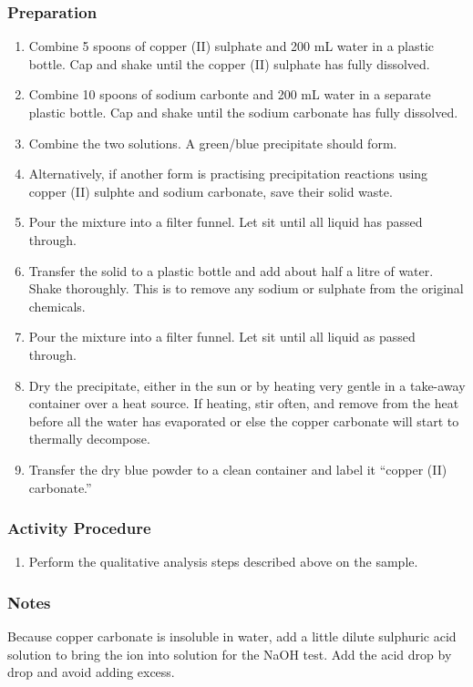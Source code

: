 \subsubsection{Preparation}
\begin{enumerate}
\item{Combine 5 spoons of copper (II) sulphate and 200 mL water in a plastic bottle. Cap and shake until the copper (II) sulphate has fully dissolved.}
\item{Combine 10 spoons of sodium carbonte and 200 mL water in a separate plastic bottle. Cap and shake until the sodium carbonate has fully dissolved.}
\item{Combine the two solutions. A green/blue precipitate should form.}
\item{Alternatively, if another form is practising precipitation reactions using copper (II) sulphte and sodium carbonate, save their solid waste.}
\item{Pour the mixture into a filter funnel. Let sit until all liquid has passed through.}
\item{Transfer the solid to a plastic bottle and add about half a litre of water. Shake thoroughly. This is to remove any sodium or sulphate from the original chemicals.}
\item{Pour the mixture into a filter funnel. Let sit until all liquid as passed through.}
\item{Dry the precipitate, either in the sun or by heating very gentle in a take-away container over a heat source. If heating, stir often, and remove from the heat before all the water has evaporated or else the copper carbonate will start to thermally decompose.}
\item{Transfer the dry blue powder to a clean container and label it ``copper (II) carbonate.''}
\end{enumerate}

\subsubsection{Activity Procedure}
\begin{enumerate}
\item{Perform the qualitative analysis steps described above on the sample.}
\end{enumerate}

\subsubsection{Notes}
Because copper carbonate is insoluble in water, add a little dilute sulphuric acid solution to bring the ion into solution for the NaOH test. Add the acid drop by drop and avoid adding excess.

